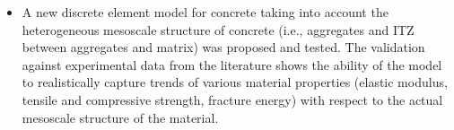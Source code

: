 \begin{itemize}
\item
A new discrete element model for concrete taking into account the heterogeneous mesoscale structure of concrete (i.e., aggregates and ITZ between aggregates and matrix) was proposed and tested.
The validation against experimental data from the literature shows the ability of the model to realistically capture trends of various material properties (elastic modulus, tensile and compressive strength, fracture energy) with respect to the actual mesoscale structure of the material.

\end{itemize}
